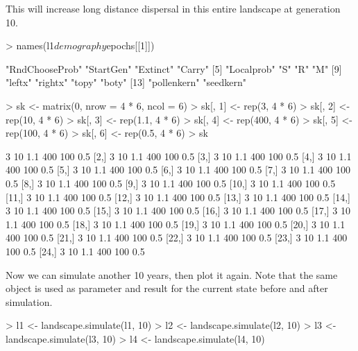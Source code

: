 \documentclass[10pt]{article}
\begin{document}
This will increase long distance dispersal in this entire landscape at generation 10.
\begin{Schunk}
\begin{Sinput}
> names(l1$demography$epochs[[1]])
\end{Sinput}
\begin{Soutput}
 [1] "RndChooseProb" "StartGen"      "Extinct"       "Carry"        
 [5] "Localprob"     "S"             "R"             "M"            
 [9] "leftx"         "rightx"        "topy"          "boty"         
[13] "pollenkern"    "seedkern"     
\end{Soutput}
\begin{Sinput}
> sk <- matrix(0, nrow = 4 * 6, ncol = 6)
> sk[, 1] <- rep(3, 4 * 6)
> sk[, 2] <- rep(10, 4 * 6)
> sk[, 3] <- rep(1.1, 4 * 6)
> sk[, 4] <- rep(400, 4 * 6)
> sk[, 5] <- rep(100, 4 * 6)
> sk[, 6] <- rep(0.5, 4 * 6)
> sk
\end{Sinput}
\begin{Soutput}
      [,1] [,2] [,3] [,4] [,5] [,6]
 [1,]    3   10  1.1  400  100  0.5
 [2,]    3   10  1.1  400  100  0.5
 [3,]    3   10  1.1  400  100  0.5
 [4,]    3   10  1.1  400  100  0.5
 [5,]    3   10  1.1  400  100  0.5
 [6,]    3   10  1.1  400  100  0.5
 [7,]    3   10  1.1  400  100  0.5
 [8,]    3   10  1.1  400  100  0.5
 [9,]    3   10  1.1  400  100  0.5
[10,]    3   10  1.1  400  100  0.5
[11,]    3   10  1.1  400  100  0.5
[12,]    3   10  1.1  400  100  0.5
[13,]    3   10  1.1  400  100  0.5
[14,]    3   10  1.1  400  100  0.5
[15,]    3   10  1.1  400  100  0.5
[16,]    3   10  1.1  400  100  0.5
[17,]    3   10  1.1  400  100  0.5
[18,]    3   10  1.1  400  100  0.5
[19,]    3   10  1.1  400  100  0.5
[20,]    3   10  1.1  400  100  0.5
[21,]    3   10  1.1  400  100  0.5
[22,]    3   10  1.1  400  100  0.5
[23,]    3   10  1.1  400  100  0.5
[24,]    3   10  1.1  400  100  0.5
\end{Soutput}
\end{Schunk}

Now we can simulate another 10 years, then plot it again.  Note that
the same object is used as parameter and result for the current state
before and after simulation.
\begin{Schunk}
\begin{Sinput}
> l1 <- landscape.simulate(l1, 10)
> l2 <- landscape.simulate(l2, 10)
> l3 <- landscape.simulate(l3, 10)
> l4 <- landscape.simulate(l4, 10)
\end{Sinput}
\end{Schunk}
\end{document}
